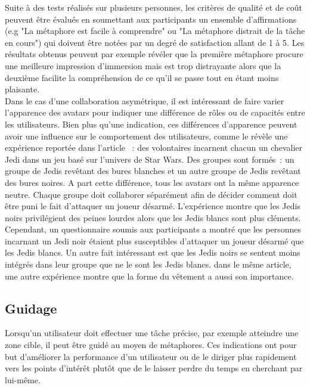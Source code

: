 \documentclass[11pt]{article}
\begin{document}
Suite à des tests réalisés sur plusieurs personnes, les critères de qualité et de coût peuvent être évalués en soumettant aux participants un ensemble d'affirmations (e.g "La métaphore est facile à comprendre" ou "La métaphore distrait de la tâche en cours") qui doivent être notées par un degré de satisfaction allant de 1 à 5. Les résultats obtenus peuvent par exemple révéler que la première métaphore procure une meilleure impression d'immersion mais est trop distrayante alors que la deuxième facilite la compréhension de ce qu'il se passe tout en étant moins plaisante.
\\

Dans le cas d'une collaboration asymétrique, il est intéressant de faire varier l'apparence des avatars pour indiquer une différence de rôles ou de capacités entre les utilisateurs. Bien plus qu'une indication, ces différences d'apparence peuvent avoir une influence sur le comportement des utilisateurs, comme le révèle une expérience reportée dans l'article \cite{jedi}~: des volontaires incarnent chacun un chevalier Jedi dans un jeu basé sur l'univers de Star Wars. Des groupes sont formés~: un groupe de Jedis revêtant des bures blanches et un autre groupe de Jedis revêtant des bures noires. A part cette différence, tous les avatars ont la même apparence neutre. Chaque groupe doit collaborer séparément afin de décider comment doit être puni le fait d'attaquer un joueur désarmé. L'expérience montre que les Jedis noirs privilégient des peines lourdes alors que les Jedis blancs sont plus cléments. Cependant, un questionnaire soumis aux participants a montré que les personnes incarnant un Jedi noir étaient plus susceptibles d'attaquer un joueur désarmé que les Jedis blancs. Un autre fait intéressant est que les Jedis noirs se sentent moins intégrés dans leur groupe que ne le sont les Jedis blancs. dans le même article, une autre expérience montre que la forme du vêtement a aussi son importance.

\subsection{Guidage}
\label{subsec:facilitation}
Lorsqu'un utilisateur doit effectuer une tâche précise, par exemple atteindre une zone cible, il peut être guidé au moyen de métaphores. Ces indications ont pour but d'améliorer la performance d'un utilisateur ou de le diriger plus rapidement vers les points d'intérêt plutôt que de le laisser perdre du temps en cherchant par lui-même.
\\
\end{document}
